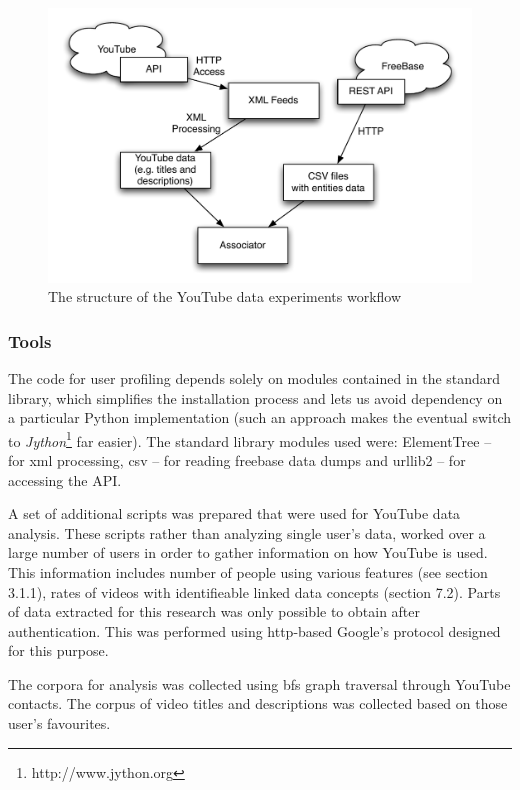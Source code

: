 \begin{figure}[h!]
  \begin{center}
	  \includegraphics[scale=0.65]{images/youtube_diagram.pdf}
	  \caption{The structure of the YouTube data experiments workflow}
  \end{center}
\end{figure}

\subsubsection{Tools}

The code for user profiling depends solely on modules contained in the standard
library, which simplifies the installation process and lets us avoid dependency
on a particular Python implementation (such an approach makes the eventual
switch to \textit{Jython}\footnote{http://www.jython.org} far easier). The
standard library modules used were: ElementTree -- for xml processing, csv --
for reading freebase data dumps and urllib2 -- for accessing the API.

A set of additional scripts was prepared that were used for YouTube data
analysis. These scripts rather than analyzing single user's data, worked over a
large number of users in order to gather information on how YouTube is used.
This information includes number of people using various features (see section
3.1.1), rates of videos with identifieable linked data concepts (section 7.2).
Parts of data extracted for this research was only possible to obtain after
authentication. This was performed using http-based Google's protocol designed
for this purpose.

The corpora for analysis was collected using bfs graph traversal through YouTube
contacts. The corpus of video titles and descriptions was collected based on
those user's favourites.
